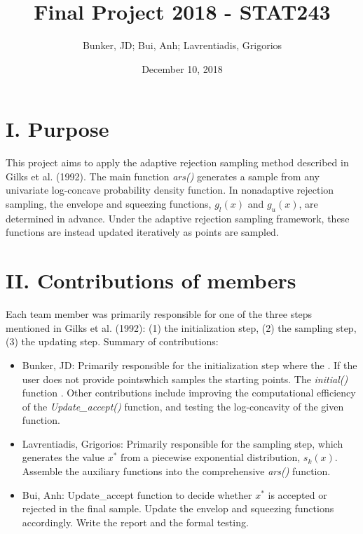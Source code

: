\documentclass[]{article}
\title{Final Project 2018 - STAT243}
\author{Bunker, JD; Bui, Anh; Lavrentiadis, Grigorios}
\date{December 10, 2018}
\begin{document}
\maketitle

\section{I. Purpose}\label{i.-purpose}

This project aims to apply the adaptive rejection sampling method
described in Gilks et al. (1992). The main function \textit{ars()}
generates a sample from any univariate log-concave probability density
function. In nonadaptive rejection sampling, the envelope and squeezing
functions, \(g_l(x)\) and \(g_u(x)\), are determined in advance. Under
the adaptive rejection sampling framework, these functions are instead
updated iteratively as points are sampled.

\section{II. Contributions of
members}\label{ii.-contributions-of-members}

Each team member was primarily responsible for one of the three steps
mentioned in Gilks et al. (1992): (1) the initialization step, (2) the
sampling step, (3) the updating step. Summary of contributions:

\begin{itemize}

\item Bunker, JD: Primarily responsible for the initialization step where the . If the user does not provide pointswhich samples the starting points. The \textit{initial()} function . Other contributions include improving the computational efficiency of the \textit{Update_accept()} function, and testing the log-concavity of the given function.

\item Lavrentiadis, Grigorios: Primarily responsible for the sampling step, which generates the value $x^*$ from a piecewise exponential distribution, $s_k(x)$. Assemble the auxiliary functions into the comprehensive \textit{ars()} function.

\item Bui, Anh: Update_accept function to decide whether $x^*$ is accepted or rejected in the final sample.  Update the envelop and squeezing functions accordingly.  Write the report and the formal testing.

\end{itemize}
\end{document}
